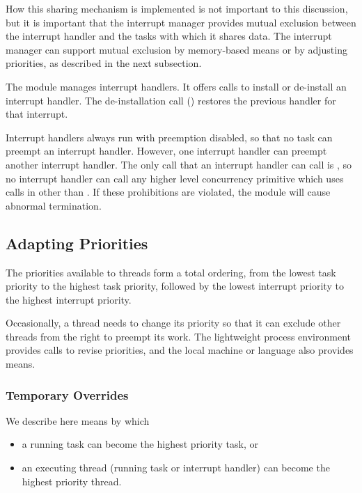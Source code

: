 How this sharing mechanism is implemented is not important to this discussion,
but it is
important that the interrupt manager provides mutual exclusion between
the interrupt handler and the tasks with which it shares data.  The interrupt
manager can support mutual exclusion by memory-based means or by adjusting
priorities, as described in the next subsection.

The module  manages interrupt handlers.  It offers calls
to install or de-install an interrupt handler.  The de-installation call
() restores the previous handler for that interrupt.

Interrupt handlers always run with preemption disabled, so that no task can
preempt an interrupt handler.  However, one interrupt handler can preempt 
another
interrupt handler.  The only  call that an interrupt handler
can call is , so no interrupt handler can call any higher
level concurrency primitive which uses calls in  other than
.  If these prohibitions are violated, the 
module will cause abnormal termination.

\subsection{Adapting Priorities}

The priorities available to threads form a total ordering, from the lowest
task priority to the highest task priority, followed by the lowest interrupt
priority to the highest interrupt priority.

Occasionally, a thread needs to change its priority so that it can exclude
other threads from the right to preempt its work.  The lightweight process
environment provides calls to revise priorities, and the local machine or
language also provides means.

\subsubsection{Temporary Overrides}
\label{overriding}

We describe here means by which
\begin{itemize}
\item
 a running task can become the highest priority task, or
\item
 an executing thread (running task or interrupt handler) can become the
 highest priority thread.
\end{itemize}


